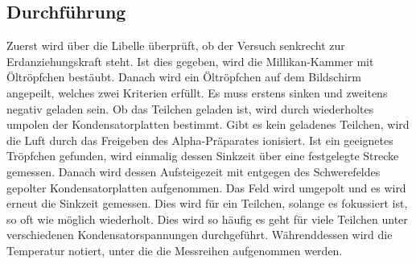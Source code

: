 \subsection{Durchführung}
\label{sec:durchführung}
Zuerst wird über die Libelle überprüft, ob der Versuch senkrecht zur Erdanziehungskraft steht.
Ist dies gegeben, wird die Millikan-Kammer mit Öltröpfchen bestäubt.
Danach wird ein Öltröpfchen auf dem Bildschirm angepeilt, welches zwei Kriterien erfüllt.
Es muss erstens sinken und zweitens negativ geladen sein.
Ob das Teilchen geladen ist, wird durch wiederholtes umpolen der Kondensatorplatten bestimmt.
Gibt es kein geladenes Teilchen, wird die Luft durch das Freigeben des Alpha-Präparates ionisiert.
Ist ein geeignetes Tröpfchen gefunden, wird einmalig dessen Sinkzeit über eine festgelegte Strecke gemessen.
Danach wird dessen Aufsteigezeit mit entgegen des Schwerefeldes gepolter Kondensatorplatten aufgenommen.
Das Feld wird umgepolt und es wird erneut die Sinkzeit gemessen.
Dies wird für ein Teilchen, solange es fokussiert ist, so oft wie möglich wiederholt.
Dies wird so häufig es geht für viele Teilchen unter verschiedenen Kondensatorspannungen durchgeführt.
Währenddessen wird die Temperatur notiert, unter die die Messreihen aufgenommen werden.
